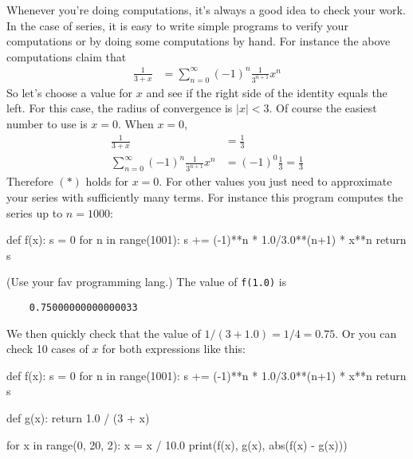 Whenever you're doing computations,
it's always a good idea to check your work.
In the case of series, it is easy to write simple programs to
verify your computations or by doing some computations by hand.
For instance the above computations claim that
\begin{align*}
\frac{1}{3+x} 
&= \sum_{n=0}^\infty (-1)^n \frac{1}{3^{n+1}} x^n \tag{$*$}
\end{align*}
So let's choose a value for $x$ and see if the 
right side of the identity equals the left.
For this case, the radius of convergence is $|x| < 3$.
Of course the easiest number to use is $x = 0$.
When $x = 0$,
\begin{align*}
\frac{1}{3 + x} &= \frac{1}{3} \\
\sum_{n=0}^\infty (-1)^n \frac{1}{3^{n+1}}x^n &= (-1)^0 \frac{1}{3} = \frac{1}{3}
\end{align*}
%
Therefore $(*)$ holds for $x = 0$.
For other values you just need to approximate your series with
sufficiently many terms.
For instance this program computes the series up to $n = 1000$:
\begin{console}[fontsize=\footnotesize]
def f(x):
    s = 0
    for n in range(1001):
        s += (-1)**n * 1.0/3.0**(n+1) * x**n
    return s
\end{console}
(Use your fav programming lang.)
The value of \verb!f(1.0)! is
\begin{verbatim}
    0.75000000000000033
\end{verbatim}
We then quickly check that the value of $1/(3 + 1.0) = 1/4 = 0.75$.
Or you can check 10 cases of $x$ for both expressions like this:
\begin{console}[fontsize=\footnotesize]
def f(x):
    s = 0
    for n in range(1001):
        s += (-1)**n * 1.0/3.0**(n+1) * x**n
        return s
        
def g(x):
    return 1.0 / (3 + x)

for x in range(0, 20, 2):
    x = x / 10.0
    print(f(x), g(x), abs(f(x) - g(x)))
\end{console}

\newpage

\begin{comment}

\end{comment}

